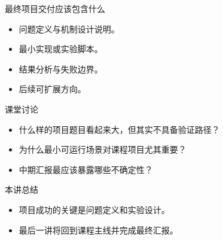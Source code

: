 \begin{frame}{最终项目交付应该包含什么}
  \begin{itemize}
    \item 问题定义与机制设计说明。
    \item 最小实现或实验脚本。
    \item 结果分析与失败边界。
    \item 后续可扩展方向。
  \end{itemize}
\end{frame}



\begin{frame}{课堂讨论}
  \begin{itemize}
    \item 什么样的项目题目看起来大，但其实不具备验证路径？
    \item 为什么最小可运行场景对课程项目尤其重要？
    \item 中期汇报最应该暴露哪些不确定性？
  \end{itemize}
\end{frame}

\begin{frame}{本讲总结}
  \begin{itemize}
    \item 项目成功的关键是问题定义和实验设计。
    \item 最后一讲将回到课程主线并完成最终汇报。
  \end{itemize}
\end{frame}

